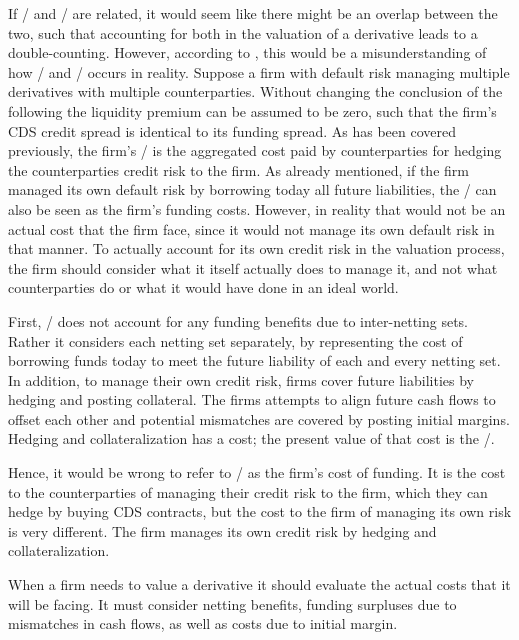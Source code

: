 \documentclass[main.tex]{subfiles}
\begin{document}
    If \DVA/ and \FVA/ are related, it would seem like there might be an overlap between the two,
    such that accounting for both in the valuation of a derivative leads to a double-counting.
    However, according to \textcite{Ruiz2015XVA}, 
    this would be a misunderstanding of how \DVA/ and \FVA/ occurs in reality.
    Suppose a firm with default risk managing multiple derivatives with multiple counterparties.
    Without changing the conclusion of the following the liquidity premium can be assumed to be zero, 
    such that the firm's CDS credit spread is identical to its funding spread.
    As has been covered previously, the firm's \DVA/ is the aggregated cost
    paid by counterparties for hedging the counterparties credit risk to the firm.
    As already mentioned, if the firm managed its own default risk by borrowing today all future liabilities,
    the \DVA/ can also be seen as the firm's funding costs.
    However, in reality that would not be an actual cost that the firm face,
    since it would not manage its own default risk in that manner.
    To actually account for its own credit risk in the valuation process,
    the firm should consider what it itself actually does to manage it,
    and not what counterparties do or what it would have done in an ideal world.

    First, \DVA/ does not account for any funding benefits due to inter-netting sets.
    Rather it considers each netting set separately, by representing the cost 
    of borrowing funds today to meet the future liability of each and every netting set.
    In addition, to manage their own credit risk, firms cover future liabilities
    by hedging and posting collateral.
    The firms attempts to align future cash flows to offset each other
    and potential mismatches are covered by posting initial margins. 
    Hedging and collateralization has a cost; 
    the present value of that cost is the \FVA/.

    Hence, it would be wrong to refer to \DVA/ as the firm's cost of funding.
    It is the cost to the counterparties of managing their credit risk to the firm,
    which they can hedge by buying CDS contracts,
    but the cost to the firm of managing its own risk is very different. 
    The firm manages its own credit risk by hedging and collateralization.

    When a firm needs to value a derivative it should evaluate the actual costs that it will be facing.
    It must consider netting benefits, funding surpluses due to mismatches in cash flows,
    as well as costs due to initial margin.
\end{document}
